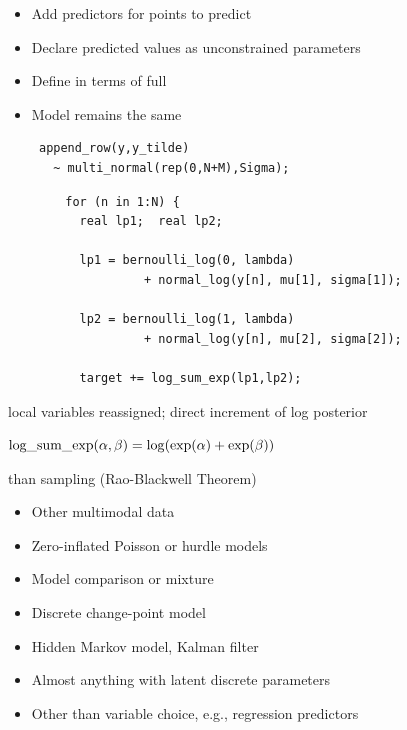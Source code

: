 \documentclass[10pt]{report}
\begin{document}
%
\begin{itemize}
\item Add predictors  for points to predict
\item Declare predicted values  as unconstrained parameters
\item Define  in terms of full 
\item Model remains the same
{\small
\begin{Verbatim}
 append_row(y,y_tilde)
   ~ multi_normal(rep(0,N+M),Sigma);
\end{Verbatim}
}
\end{itemize}


%
{\footnotesize
\begin{Verbatim}
        for (n in 1:N) {
          real lp1;  real lp2;

          lp1 = bernoulli_log(0, lambda)
                   + normal_log(y[n], mu[1], sigma[1]);

          lp2 = bernoulli_log(1, lambda)
                   + normal_log(y[n], mu[2], sigma[2]);

          target += log_sum_exp(lp1,lp2);
\end{Verbatim}
}
\vspace*{2pt}
\begin{subitemize}
\item local variables reassigned; direct increment of log posterior
\item $\mbox{\rm log\_sum\_exp}(\alpha,\beta) = \log (\exp(\alpha) + \exp(\beta))$
\item {} than sampling (Rao-Blackwell Theorem)
\vspace*{10pt}
\end{subitemize}


%
\begin{itemize}
\item Other multimodal data
\item Zero-inflated Poisson or hurdle models
\item Model comparison or mixture
\item Discrete change-point model
\item Hidden Markov model, Kalman filter
\item Almost anything with latent discrete parameters
\hfill
\item Other than variable choice, e.g., regression predictors
\end{itemize}
\end{document}
